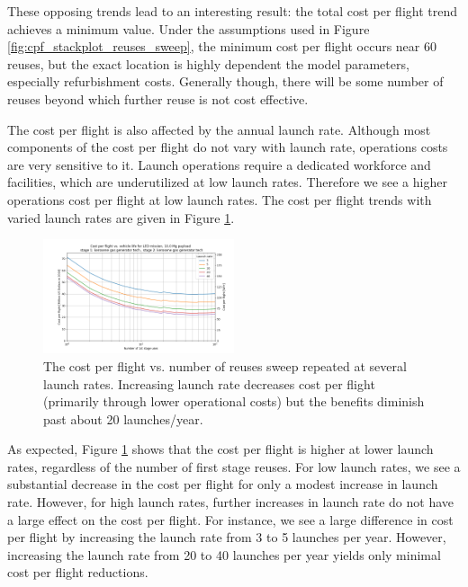 \documentclass[conf]{new-aiaa}
\begin{document}
\begin{multicols}{2}
These opposing trends lead to an interesting result: the total cost per flight trend achieves a minimum value. Under the assumptions used in Figure \ref{fig:cpf_stackplot_reuses_sweep}, the minimum cost per flight occurs near 60 reuses, but the exact location is highly dependent the model parameters, especially refurbishment costs. Generally though, there will be some number of reuses beyond which further reuse is not cost effective.

The cost per flight is also affected by the annual launch rate. Although most components of the cost per flight do not vary with launch rate, operations costs are very sensitive to it. Launch operations require a dedicated workforce and facilities, which are underutilized at low launch rates. Therefore we see a higher operations cost per flight at low launch rates. The cost per flight trends with varied launch rates are given in Figure \ref{fig:cpf_reuses_sweep_vary_launch_rate}. 

\begin{figure}[H]
    \centering
    \includegraphics[width=0.5\textwidth]{../../lvreuse/analysis/combined/plots/cpf_reuses_sweep_vary_launch_rate}
    \caption{\label{fig:cpf_reuses_sweep_vary_launch_rate} The cost per flight vs. number of reuses sweep repeated at several launch rates. Increasing launch rate decreases cost per flight (primarily through lower operational costs) but the benefits diminish past about 20 launches/year.}
\end{figure}

As expected, Figure \ref{fig:cpf_reuses_sweep_vary_launch_rate} shows that the cost per flight is higher at lower launch rates, regardless of the number of first stage reuses. For low launch rates, we see a substantial decrease in the cost per flight for only a modest increase in launch rate. However, for high launch rates, further increases in launch rate do not have a large effect on the cost per flight. For instance, we see a large difference in cost per flight by increasing the launch rate from 3 to 5 launches per year. However, increasing the launch rate from 20 to 40 launches per year yields only minimal cost per flight reductions. 


\end{multicols}
\end{document}
